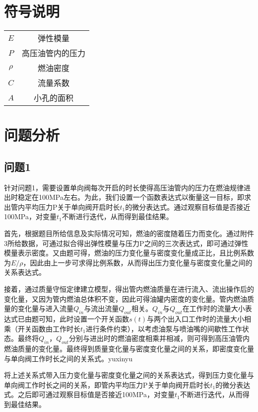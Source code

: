 \documentclass{cumcmthesis}
\begin{document}
\section{符号说明}

\begin{center}
	\begin{tabular}{cc}
		\toprule[1.5pt]
		\makebox[0.3\textwidth][c]{符号}	& \makebox[0.4\textwidth][c]{意义} \\
		\hline
	 $E$ & 弹性模量 \\
	$P$ & 高压油管内的压力 \\  
	$\rho$ & 燃油密度 \\ 
	$C$ & 流量系数 \\
	$A$ & 小孔的面积 \\
	\bottomrule[1.5pt]
	\end{tabular}
\end{center}

\section{问题分析}
\subsection{问题1}
针对问题1，需要设置单向阀每次开启的时长使得高压油管内的压力在燃油规律进出时稳定在100MPa左右。为此，我们设置一个函数表达式以衡量这一目标，即求出管内平均压力P关于单向阀开启时长$t_{1}$的微分表达式。通过观察目标值是否接近100MPa，对变量$t_{1}$不断进行迭代，从而得到最佳结果。

首先，根据题目所给信息及实际情况可知，燃油的密度随着压力而变化。通过附件3所给数据，可通过拟合得出弹性模量与压力P之间的三次表达式，即可通过弹性模量表示密度。又由题可得，燃油的压力变化量与密度变化量成正比，且比例系数为$E/\rho$，因此由上一步可求得比例系数，从而得出压力变化量与密度变化量之间的关系表达式。

接着，通过质量守恒定律建立模型，得出管内燃油质量在进行流入、流出操作后的变化量，又因为管内燃油总体积不变，因此可得油罐内密度的变化量。管内燃油质量的变化量与进入流量$Q_{in}$与流出流量$Q_{out}$相关。$Q_{in}$与$Q_{out}$在工作时的流量大小表达式已由题可知，此时设置一个开关函数$s(t)$与两个出入口工作时的流量大小相乘（开关函数由工作时长$t_{1}$进行条件约束），以考虑油泵与喷油嘴的间歇性工作状态。最终将$Q_{in}$，$Q_{out}$分别与进出时的燃油密度相乘并相减，则可得到高压油管内燃油质量的变化量。最终得到质量变化量与密度变化量之间的关系，即密度变化量与单向阀工作时长之间的关系式。yuxinyu

将上述关系式带入压力变化量与密度变化量之间的关系表达式，得到压力变化量与单向阀工作时长之间的关系，即管内平均压力P关于单向阀开启时长$t_{1}$的微分表达式。之后即可通过观察目标值是否接近100MPa，对变量$t_{1}$不断进行迭代，从而得到最佳结果。
\end{document}
